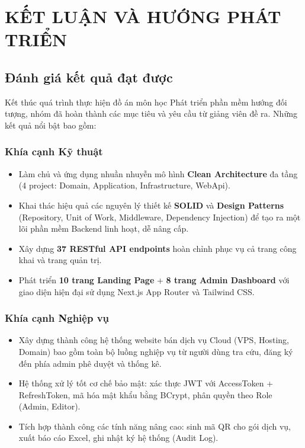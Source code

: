 \chapter{KẾT LUẬN VÀ HƯỚNG PHÁT TRIỂN}

\section{Đánh giá kết quả đạt được}
Kết thúc quá trình thực hiện đồ án môn học Phát triển phần mềm hướng đối tượng, nhóm đã hoàn thành các mục tiêu và yêu cầu từ giảng viên đề ra. Những kết quả nổi bật bao gồm:

\subsection{Khía cạnh Kỹ thuật}
\begin{itemize}
    \item Làm chủ và ứng dụng nhuần nhuyễn mô hình \textbf{Clean Architecture} đa tầng (4 project: Domain, Application, Infrastructure, WebApi).
    \item Khai thác hiệu quả các nguyên lý thiết kế \textbf{SOLID} và \textbf{Design Patterns} (Repository, Unit of Work, Middleware, Dependency Injection) để tạo ra một lõi phần mềm Backend linh hoạt, dễ nâng cấp.
    \item Xây dựng \textbf{37 RESTful API endpoints} hoàn chỉnh phục vụ cả trang công khai và trang quản trị.
    \item Phát triển \textbf{10 trang Landing Page} + \textbf{8 trang Admin Dashboard} với giao diện hiện đại sử dụng Next.js App Router và Tailwind CSS.
\end{itemize}

\subsection{Khía cạnh Nghiệp vụ}
\begin{itemize}
    \item Xây dựng thành công hệ thống website bán dịch vụ Cloud (VPS, Hosting, Domain) bao gồm toàn bộ luồng nghiệp vụ từ người dùng tra cứu, đăng ký đến phía admin phê duyệt và thống kê.
    \item Hệ thống xử lý tốt cơ chế bảo mật: xác thực JWT với AccessToken + RefreshToken, mã hóa mật khẩu bằng BCrypt, phân quyền theo Role (Admin, Editor).
    \item Tích hợp thành công các tính năng nâng cao: sinh mã QR cho gói dịch vụ, xuất báo cáo Excel, ghi nhật ký hệ thống (Audit Log).
\end{itemize}

